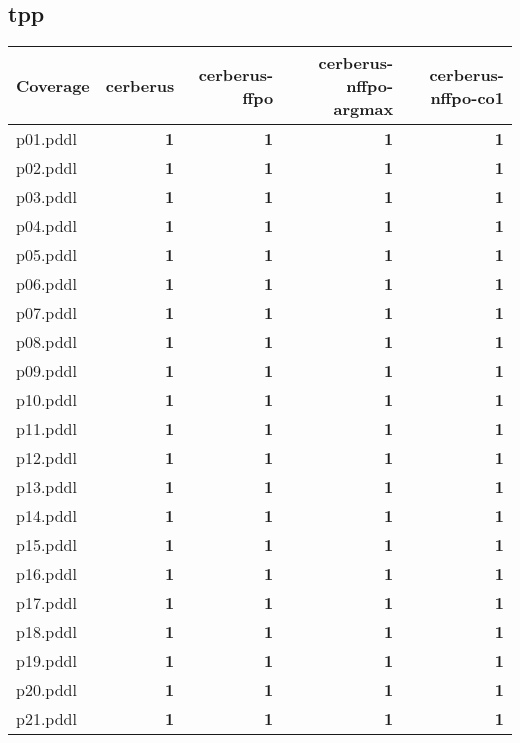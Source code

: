 \documentclass{article}
\begin{document}
\hypertarget{coverage-tpp}{}
\subsection*{tpp}

\begin{tabular}{@{}lrrrr@{}}
Coverage & cerberus & cerberus-ffpo & cerberus-nffpo-argmax & cerberus-nffpo-co1 \\
\midrule
p01.pddl & \textbf{1} & \textbf{1} & \textbf{1} & \textbf{1} \\
p02.pddl & \textbf{1} & \textbf{1} & \textbf{1} & \textbf{1} \\
p03.pddl & \textbf{1} & \textbf{1} & \textbf{1} & \textbf{1} \\
p04.pddl & \textbf{1} & \textbf{1} & \textbf{1} & \textbf{1} \\
p05.pddl & \textbf{1} & \textbf{1} & \textbf{1} & \textbf{1} \\
p06.pddl & \textbf{1} & \textbf{1} & \textbf{1} & \textbf{1} \\
p07.pddl & \textbf{1} & \textbf{1} & \textbf{1} & \textbf{1} \\
p08.pddl & \textbf{1} & \textbf{1} & \textbf{1} & \textbf{1} \\
p09.pddl & \textbf{1} & \textbf{1} & \textbf{1} & \textbf{1} \\
p10.pddl & \textbf{1} & \textbf{1} & \textbf{1} & \textbf{1} \\
p11.pddl & \textbf{1} & \textbf{1} & \textbf{1} & \textbf{1} \\
p12.pddl & \textbf{1} & \textbf{1} & \textbf{1} & \textbf{1} \\
p13.pddl & \textbf{1} & \textbf{1} & \textbf{1} & \textbf{1} \\
p14.pddl & \textbf{1} & \textbf{1} & \textbf{1} & \textbf{1} \\
p15.pddl & \textbf{1} & \textbf{1} & \textbf{1} & \textbf{1} \\
p16.pddl & \textbf{1} & \textbf{1} & \textbf{1} & \textbf{1} \\
p17.pddl & \textbf{1} & \textbf{1} & \textbf{1} & \textbf{1} \\
p18.pddl & \textbf{1} & \textbf{1} & \textbf{1} & \textbf{1} \\
p19.pddl & \textbf{1} & \textbf{1} & \textbf{1} & \textbf{1} \\
p20.pddl & \textbf{1} & \textbf{1} & \textbf{1} & \textbf{1} \\
p21.pddl & \textbf{1} & \textbf{1} & \textbf{1} & \textbf{1} \\

\end{tabular}
\end{document}
